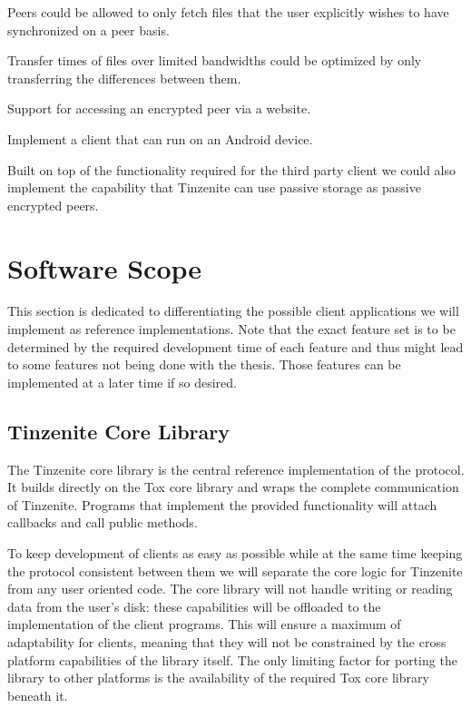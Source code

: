 \begin{description}[leftmargin=7.5em,style=nextline,noitemsep,nolistsep]
\item[Shadow Files]
    Peers could be allowed to only fetch files that the user explicitly wishes to have synchronized on a peer basis.
\item[Delta Updates]
    Transfer times of files over limited bandwidths could be optimized by only transferring the differences between them.
\item[Web Interface]
    Support for accessing an encrypted peer via a website.
\item[Mobile Client]
    Implement a client that can run on an Android device.
\item[Passive Peer]
    Built on top of the functionality required for the third party client we could also implement the capability that Tinzenite can use passive storage as passive encrypted peers.
\end{description}

\section{Software Scope}
\label{sec:Software Scope}

This section is dedicated to differentiating the possible client applications we will implement as reference implementations.
Note that the exact feature set is to be determined by the required development time of each feature and thus might lead to some features not being done with the thesis.
Those features can be implemented at a later time if so desired.

\subsection{Tinzenite Core Library}

The Tinzenite core library is the central reference implementation of the protocol.
It builds directly on the Tox core library and wraps the complete communication of Tinzenite.
Programs that implement the provided functionality will attach callbacks and call public methods.

To keep development of clients as easy as possible while at the same time keeping the protocol consistent between them we will separate the core logic for Tinzenite from any user oriented code.
The core library will not handle writing or reading data from the user's disk: these capabilities will be offloaded to the implementation of the client programs.
This will ensure a maximum of adaptability for clients, meaning that they will not be constrained by the cross platform capabilities of the library itself.
The only limiting factor for porting the library to other platforms is the availability of the required Tox core library beneath it.

